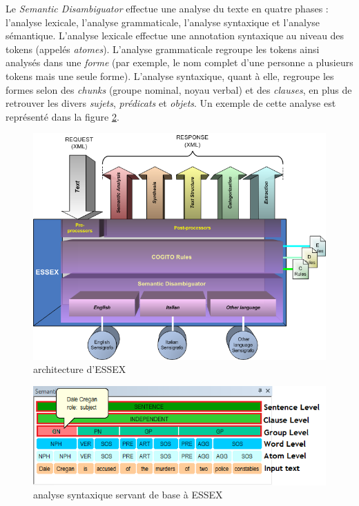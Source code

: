\documentclass[12pt,a4paper,times,twoside,openright]{report}
\begin{document}
Le \emph{Semantic Disambiguator} effectue une analyse du texte en quatre phases : l'analyse lexicale, l'analyse grammaticale, l'analyse syntaxique et l'analyse sémantique. L'analyse lexicale effectue une annotation syntaxique au niveau des tokens (appelés \emph{atomes}). L'analyse grammaticale regroupe les tokens ainsi analysés dans une \emph{forme} (par exemple, le nom complet d'une personne a plusieurs tokens mais une seule forme). L'analyse syntaxique, quant à elle, regroupe les formes selon des \emph{chunks} (groupe nominal, noyau verbal) et des \emph{clauses}, en plus de retrouver les divers \emph{sujets}, \emph{prédicats} et \emph{objets}. Un exemple de cette analyse est représenté dans la figure \ref{fig:cogito-syntactic-analysis}.

\begin{figure}[ht!]
\centering
\includegraphics[scale=0.4]{images/ExpertSystem/ESSEX-Architecture}
\caption{architecture d'ESSEX}
\label{fig:essex-architecture}
\end{figure}

\begin{figure}[ht!]
\centering
\includegraphics[scale=0.7]{images/ExpertSystem/disambiguation_html_21066960}
\caption{analyse syntaxique servant de base à ESSEX}
\label{fig:cogito-syntactic-analysis}
\end{figure}
\end{document}
